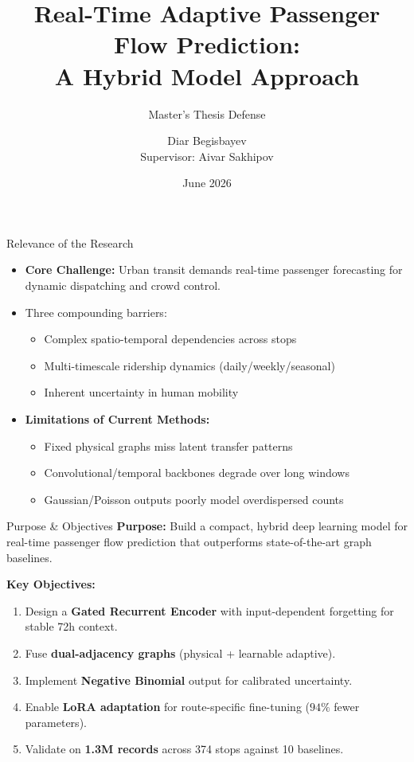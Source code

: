 \documentclass[aspectratio=169, 11pt]{beamer}
\title{Real-Time Adaptive Passenger Flow Prediction:\\A Hybrid Model Approach}
\subtitle{Master's Thesis Defense}
\author{Diar Begisbayev\\[0.3em]{\small Supervisor: Aivar Sakhipov}}
\institute{School of Computer Science and Engineering\\Astana IT University}
\date{June 2026}
\begin{document}
\begin{frame}
  \titlepage
\end{frame}

\begin{frame}{Relevance of the Research}
  \begin{itemize}
    \item \textbf{Core Challenge:} Urban transit demands \textcolor{accent}{real-time passenger forecasting} for dynamic dispatching and crowd control.
    \item Three compounding barriers:
    \begin{itemize}
      \item Complex \textcolor{accent}{spatio-temporal dependencies} across stops
      \item \textcolor{accent}{Multi-timescale} ridership dynamics (daily/weekly/seasonal)
      \item Inherent \textcolor{accent}{uncertainty} in human mobility
    \end{itemize}
    \item \textbf{Limitations of Current Methods:}
    \begin{itemize}
      \item Fixed physical graphs miss latent transfer patterns
      \item Convolutional/temporal backbones degrade over long windows
      \item Gaussian/Poisson outputs poorly model \textcolor{accent}{overdispersed counts}
    \end{itemize}
  \end{itemize}
\end{frame}

\begin{frame}{Purpose \& Objectives}
  \textbf{Purpose:} Build a compact, hybrid deep learning model for \textcolor{accent}{real-time passenger flow prediction} that outperforms state-of-the-art graph baselines.

  \vspace{0.5em}
  \textbf{Key Objectives:}
  \begin{enumerate}
    \item Design a \textbf{Gated Recurrent Encoder} with input-dependent forgetting for stable 72h context.
    \item Fuse \textbf{dual-adjacency graphs} (physical + learnable adaptive).
    \item Implement \textbf{Negative Binomial} output for calibrated uncertainty.
    \item Enable \textbf{LoRA adaptation} for route-specific fine-tuning (\textcolor{accent}{$94\%$ fewer parameters}).
    \item Validate on \textbf{1.3M records} across 374 stops against 10 baselines.
  \end{enumerate}
\end{frame}
\end{document}
